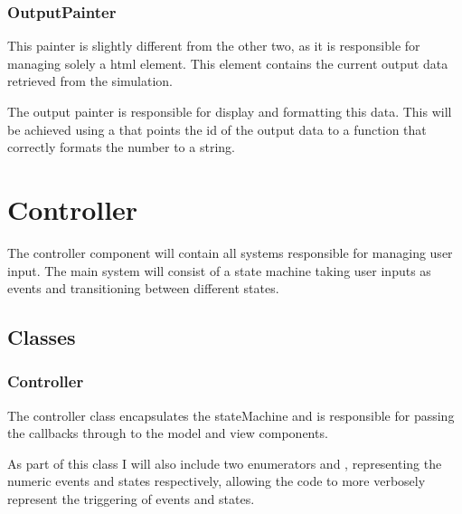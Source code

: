 
        \subsubsection{OutputPainter}

            This painter is slightly different from the other two, as it is responsible for managing solely a html element. This element contains the current output data retrieved from the simulation.

            The output painter is responsible for display and formatting this data. This will be achieved using a  that points the id of the output data to a function that correctly formats the number to a string.



\section{Controller}

    The controller component will contain all systems responsible for managing user input. The main system will consist of a state machine taking user inputs as events and transitioning between different states.

    \subsection{Classes}

        \subsubsection{Controller}

            The controller class encapsulates the stateMachine and is responsible for passing the callbacks through to the model and view components.

            As part of this class I will also include two enumerators  and , representing the numeric events and states respectively, allowing the code to more verbosely represent the triggering of events and states.

